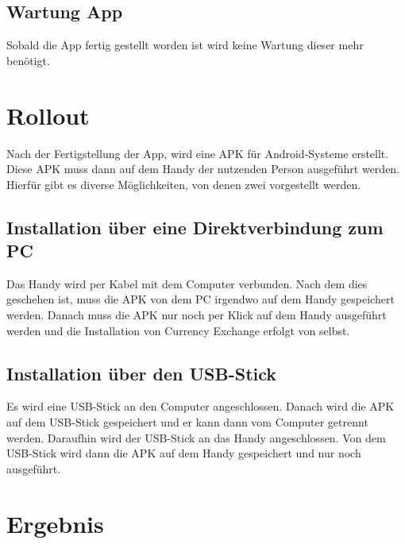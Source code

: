 \documentclass[conference]{IEEEtran}
\begin{document}
\subsection{Wartung App}
Sobald die App fertig gestellt worden ist wird keine Wartung dieser mehr benötigt.

\section{Rollout}
Nach der Fertigstellung der App, wird eine APK für Android-Systeme erstellt. Diese APK muss dann auf dem Handy der nutzenden Person ausgeführt werden. Hierfür gibt es diverse Möglichkeiten, von denen zwei vorgestellt werden. 

\subsection{Installation über eine Direktverbindung zum PC}
Das Handy wird per Kabel mit dem Computer verbunden. Nach dem dies geschehen ist, muss die APK von dem PC irgendwo auf dem Handy gespeichert werden. Danach muss die APK nur noch per Klick auf dem Handy ausgeführt werden und die Installation von Currency Exchange erfolgt von selbst.

\subsection{Installation über den USB-Stick}
Es wird eine USB-Stick an den Computer angeschlossen. Danach wird die APK auf dem USB-Stick gespeichert und er kann dann vom Computer getrennt werden. Daraufhin wird der USB-Stick an das Handy angeschlossen. Von dem USB-Stick wird dann die APK auf dem Handy gespeichert und nur noch ausgeführt. 

\section{Ergebnis}
\end{document}
